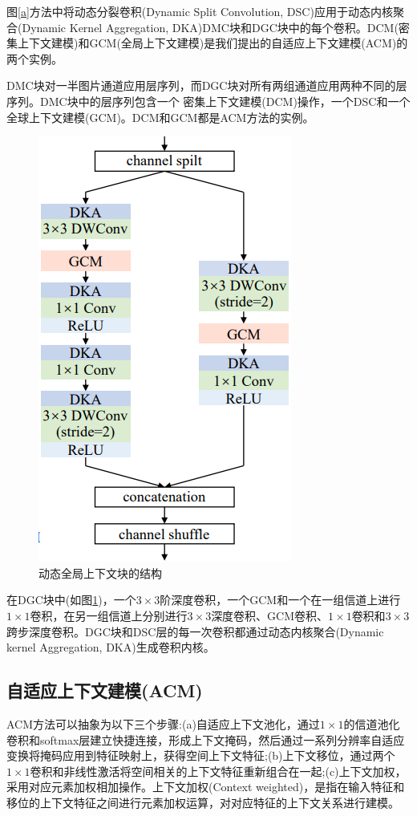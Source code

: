 \documentclass[hyperref]{ctexart}
\begin{document}
\begin{multicols}{2}
	图\ref{a}方法中将动态分裂卷积(Dynamic Split Convolution, DSC)应用于动态内核聚合(Dynamic Kernel Aggregation, DKA)DMC块和DGC块中的每个卷积。DCM(密集上下文建模)和GCM(全局上下文建模)是我们提出的自适应上下文建模(ACM)的两个实例。
	
	DMC块对一半图片通道应用层序列，而DGC块对所有两组通道应用两种不同的层序列。DMC块中的层序列包含一个
	密集上下文建模(DCM)操作，一个DSC和一个全球上下文建模(GCM)。DCM和GCM都是ACM方法的实例。
		\begin{figure}[H]
			\centering
			\includegraphics[scale = 0.45]{3}
			\caption{动态全局上下文块的结构}
			\label{b}
		\end{figure}
	在DGC块中(如图\ref{b})，一个$3\times3$阶深度卷积，一个GCM和一个在一组信道上进行$1\times1$卷积，在另一组信道上分别进行$3\times3$深度卷积、GCM卷积、$1\times1$卷积和$3\times3$跨步深度卷积。DGC块和DSC层的每一次卷积都通过动态内核聚合(Dynamic kernel Aggregation, DKA)生成卷积内核。
	\subsection{自适应上下文建模(ACM)}
	ACM方法可以抽象为以下三个步骤:(a)自适应上下文池化，通过$1\times1$的信道池化卷积和softmax层建立快捷连接，形成上下文掩码，然后通过一系列分辨率自适应变换将掩码应用到特征映射上，获得空间上下文特征;(b)上下文移位，通过两个$1\times1$卷积和非线性激活将空间相关的上下文特征重新组合在一起;(c)上下文加权，采用对应元素加权相加操作。上下文加权(Context weighted)，是指在输入特征和移位的上下文特征之间进行元素加权运算，对对应特征的上下文关系进行建模。
	

\end{multicols}
\end{document}
